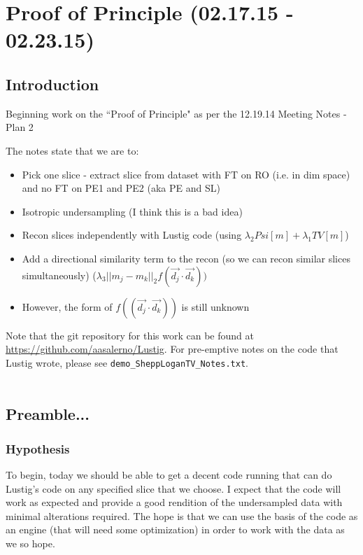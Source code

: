\documentclass[11 pt]{article}
\let\oldsection\section
\renewcommand\section{\clearpage\newpage\oldsection}
\begin{document}
\section{Proof of Principle (02.17.15 - 02.23.15)}

  \subsection{Introduction}
    Beginning work on the ``Proof of Principle" as per the 12.19.14 Meeting Notes - Plan 2

    The notes state that we are to:
    \begin{itemize}
      \item Pick one slice - extract slice from dataset with FT on RO (i.e. in dim space) and no FT on PE1 and PE2 (aka PE and SL)
      \item Isotropic undersampling (I think this is a bad idea)
      \item Recon slices independently with Lustig code (using $\lambda_2 Psi[m] + \lambda_1 TV[m]$)
      \item Add a directional similarity term to the recon (so we can recon similar slices simultaneously) ($\lambda_3 ||m_j - m_k||_2 f(\vec{d_j} \cdot \vec{d_k}))$
      \item However, the form of $f((\vec{d_j}\cdot \vec{d_k}))$ is still unknown
      \end{itemize}

    \noindent Note that the git repository for this work can be found at \url{https://github.com/aasalerno/Lustig}. For pre-emptive notes on the code that Lustig wrote, please see \verb!demo_SheppLoganTV_Notes.txt!. \\ \\

  \subsection{Preamble...}
    
    \subsubsection{Hypothesis}

        To begin, today we should be able to get a decent code running that can do Lustig's code on any specified slice that we choose. I expect that the code will work as expected and provide a good rendition of the undersampled data with minimal alterations required. The hope is that we can use the basis of the code as an engine (that will need some optimization) in order to work with the data as we so hope.
\end{document}
